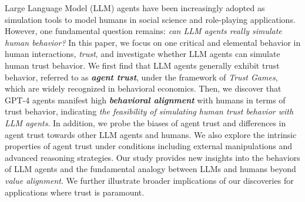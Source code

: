





Large Language Model (LLM) agents have been increasingly adopted as simulation tools to model humans in social science and role-playing applications. 
However, one fundamental question remains: \textit{can LLM agents really simulate human behavior?}
In this paper, we focus on one critical and elemental behavior in human interactions, \textit{trust},
and investigate whether LLM agents can simulate human trust behavior.
We first find that LLM agents generally exhibit trust behavior, referred to as \textbf{\textit{agent trust}}, under the framework of \textit{Trust Games}, which are widely recognized in behavioral economics.
Then, we discover that GPT-4 agents manifest
high \textbf{\textit{behavioral alignment}} with humans in terms of trust behavior, indicating \textit{the feasibility of simulating human trust behavior with LLM agents}.
In addition,  we probe the biases of agent trust and  differences in agent trust towards other LLM agents and humans. We also explore the intrinsic properties of agent trust under conditions including external manipulations and advanced reasoning strategies.
Our study provides new insights into the behaviors of LLM agents and the fundamental analogy between LLMs and humans beyond \textit{value alignment}.
We further illustrate broader implications of our discoveries for applications where trust is paramount.















